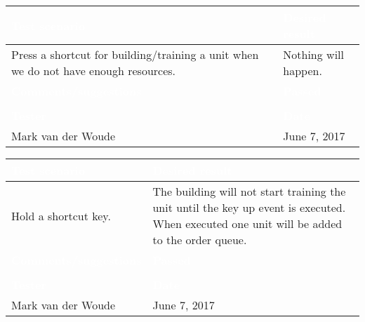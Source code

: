 \begin{tabularx}{\textwidth}{|X|X|}
\hline
\rowcolor{lightgray}\textcolor{white}{\textbf{Test scenario}} &
\textcolor{white}{\textbf{Desired result}}       
\\\hline
Press a shortcut for building/training a unit when we do not have enough resources. & Nothing will happen.
\\\hline
\rowcolor{lightgray}\textcolor{white}{\textbf{Comments/suggestions}} & 
\textcolor{white}{\textbf{Passed}}
\\\hline
 & \cellcolor{green}                       
\\\hline
\rowcolor{lightgray}\textcolor{white}{\textbf{Tester}} & 
\textcolor{white}{\textbf{Date}}               
\\\hline
Mark van der Woude & June 7, 2017                               		 
\\\hline
\end{tabularx}

\begin{tabularx}{\textwidth}{|X|X|}
\hline
\rowcolor{lightgray}\textcolor{white}{\textbf{Test scenario}} &
\textcolor{white}{\textbf{Desired result}}       
\\\hline
Hold a shortcut key.  & The building will not start training the unit until the key up event is executed. When executed one unit will be added to the order queue.
\\\hline
\rowcolor{lightgray}\textcolor{white}{\textbf{Comments/suggestions}} & 
\textcolor{white}{\textbf{Passed}}
\\\hline
 & \cellcolor{green}                       
\\\hline
\rowcolor{lightgray}\textcolor{white}{\textbf{Tester}} & 
\textcolor{white}{\textbf{Date}}               
\\\hline
Mark van der Woude & June 7, 2017                               		 
\\\hline
\end{tabularx}